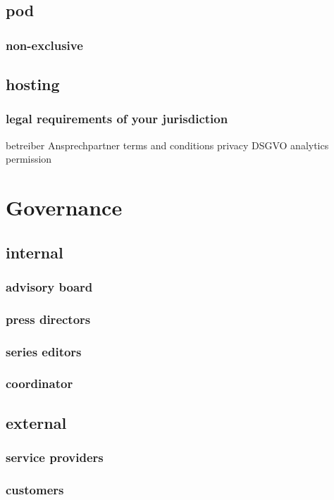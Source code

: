 \documentclass[guidelines,nonflat,modfonts] {langsci/langscibook}
\begin{document}
\subsection{pod}
\subsubsection{non-exclusive}
\subsection{hosting}
\subsubsection{legal requirements of your jurisdiction}
                    betreiber
                    Ansprechpartner
                    terms and conditions
                    privacy
                        DSGVO
                        analytics
                        permission
\section{Governance}
\subsection{internal}
\subsubsection{advisory board}
\subsubsection{press directors}
\subsubsection{series editors}
\subsubsection{coordinator}
\subsection{external}
\subsubsection{service providers}
\subsubsection{customers}
\end{document}

